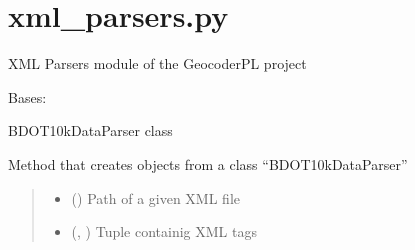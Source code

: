 \documentclass[letterpaper,10pt,english]{sphinxmanual}
\begin{document}
\sphinxstepscope


\chapter{xml\_parsers.py}
\label{\detokenize{xml_parsers:module-xml_parsers}}\label{\detokenize{xml_parsers:xml-parsers-py}}\label{\detokenize{xml_parsers::doc}}
\sphinxAtStartPar
XML Parsers module of the GeocoderPL project

\begin{fulllineitems}
\label{\detokenize{xml_parsers:xml_parsers.BDOT10kDataParser}}
\pysigstartsignatures
{}
\pysigstopsignatures
\sphinxAtStartPar
Bases: {\hyperref[\detokenize{xml_parsers:xml_parsers.XmlParser}]{}}

\sphinxAtStartPar
BDOT10kDataParser class

\begin{fulllineitems}
\label{\detokenize{xml_parsers:xml_parsers.BDOT10kDataParser.__init__}}
\pysigstartsignatures
{}
\pysigstopsignatures
\sphinxAtStartPar
Method that creates objects from a class “BDOT10kDataParser”
\begin{quote}\begin{description}
\begin{itemize}
\item {} 
\sphinxAtStartPar
{} () \textendash{} Path of a given XML file

\item {} 
\sphinxAtStartPar
{} (\sphinxcode{\sphinxupquote{Tuple}}{[}, \sphinxcode{\sphinxupquote{...}}{]}) \textendash{} Tuple containig XML tags


\end{itemize}
\end{description}
\end{quote}
\end{fulllineitems}
\end{fulllineitems}
\end{document}
